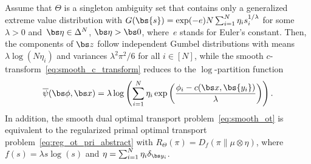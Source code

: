 \documentclass[11pt, a4paper, oneside, reqno]{article}
\begin{document}
	\begin{proposition}
		\label{prop:gumbel}
		Assume that $\Theta$ is a singleton ambiguity set that contains only a generalized extreme value distribution with $G( \bs{s}) = \exp(-e)N\sum_{i=1}^N \eta_i s_i^{1/\lambda}$ for some $\lambda > 0$ and~$\bs \eta \in \Delta^N$, $\bs\eta> \bs 0${\color{black}, where~$e$ stands for Euler's constant}. Then, the components of $\bs z$ follow independent Gumbel distributions with means $\lambda \log(N \eta_i)$ and variances $\lambda^2 \pi^2 /6$ for all $i\in[N]$,
		while the smooth $c$-transform~\eqref{eq:smooth_c_transform} reduces to the $\log$-partition function \begin{equation}
		\label{eq:partition:function}
		\overline\psi(\bs \phi, \bs x) = \lambda \log\left(\sum_{i=1}^N \eta_i \exp\left( \frac{\phi_i -c(\bs x,\bs {y_i})}{\lambda} \right) \right).
		\end{equation}
		In addition, the smooth dual optimal transport problem~\eqref{eq:smooth_ot} is equivalent to the regularized primal optimal transport problem~\eqref{eq:reg_ot_pri_abstract} with $R_\Theta(\pi) =  D_f(\pi \| \mu \otimes \eta)$, where $f(s) =\lambda s\log(s)$ and $\eta = \sum_{i =1}^N \eta_i \delta_{\bs y_i}$.
	\end{proposition}
	
\end{document}
